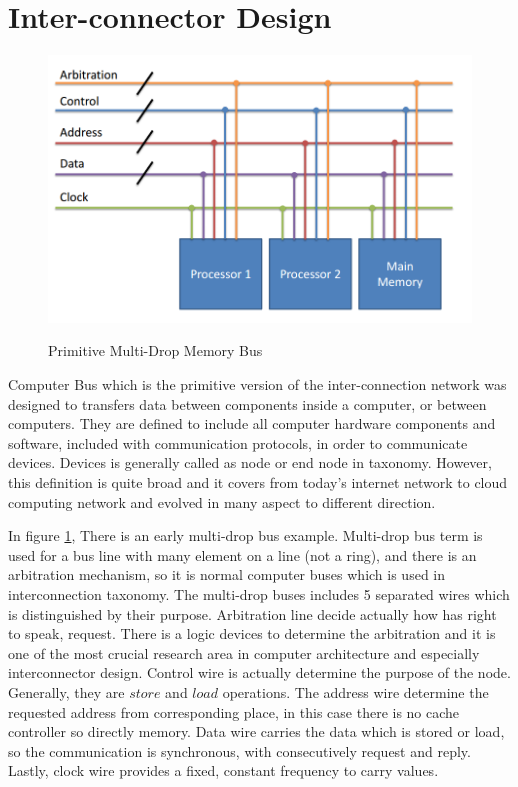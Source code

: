 \section{Inter-connector Design}
\begin{figure}[h!]
    \centering
    \includegraphics[width=1\textwidth]{img/bus_primatives.png}
    \caption{Primitive Multi-Drop Memory Bus }
    \cite{ComputerArchCoursera}
    \label{fig:bus_primative}
\end{figure}
Computer Bus which is the primitive version of the inter-connection network was designed to transfers data between components inside a computer, or between computers. They are defined to include all computer hardware components and software, included with communication protocols, in order to communicate devices. Devices is generally called as node or end node in taxonomy. However, this definition is quite broad and it covers from today's internet network to cloud computing network and evolved in many aspect to different direction.

In figure \ref{fig:bus_primative}, There is an early multi-drop bus example. Multi-drop bus term is used for a bus line with many element on a line (not a ring), and there is an arbitration mechanism, so it is normal computer buses which is used in interconnection taxonomy. The multi-drop buses includes 5 separated wires which is distinguished by their purpose. Arbitration line decide actually how has right to speak, request. There is a logic devices to determine the arbitration and it is one of the most crucial research area in computer architecture and especially interconnector design\cite{hennessy2012computer}. Control wire is actually determine the purpose of the node. Generally, they are $store$ and $load$ operations. The address wire determine the requested address from corresponding place, in this case there is no cache controller so directly memory. Data wire carries the data which is stored or load, so the communication is synchronous, with consecutively request and reply. Lastly, clock wire provides a fixed, constant frequency to carry values.\cite{hennessy2012computer}

